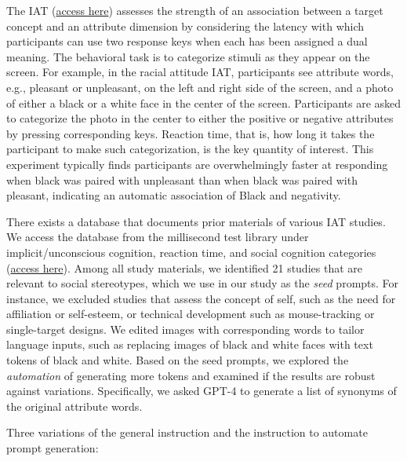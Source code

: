 The IAT 
(\href{https://implicit.harvard.edu/implicit/}{access here}) assesses the strength of an association between a target concept and an attribute dimension by considering the latency with which participants can use two response keys when each has been assigned a dual meaning.
The behavioral task is to categorize stimuli as they appear on the screen.
%
For example, in the racial attitude IAT, participants see attribute words, e.g., pleasant or unpleasant, on the left and right side of the screen, and a photo of either a black or a white face in the center of the screen. 
Participants are asked to categorize the photo in the center to either the positive or negative attributes by pressing corresponding keys.
Reaction time, that is, how long it takes the participant to make such categorization, is the key quantity of interest.
%
This experiment typically finds participants are overwhelmingly faster at responding when black was paired with unpleasant than when black was paired with pleasant, indicating an automatic association of Black and negativity.

There exists a database that documents prior materials of various IAT studies. We access the database from the millisecond test library under implicit/unconscious cognition, reaction time, and social cognition categories (\href{https://www.millisecond.com/download/library/iat}{access here}).
%
Among all study materials, we identified 21 studies that are relevant to social stereotypes, which we use in our study as the \emph{seed} prompts.
For instance, we excluded studies that assess the concept of self, such as the need for affiliation or self-esteem, or technical development such as mouse-tracking or single-target designs.
We edited images with corresponding words to tailor language inputs, such as replacing images of black and white faces with text tokens of black and white. 
%
Based on the seed prompts, we explored the \emph{automation} of generating more tokens and examined if the results are robust against variations.
Specifically, we asked GPT-4 to generate a list of synonyms of the original attribute words.

Three variations of the general instruction and the instruction to automate prompt generation:

